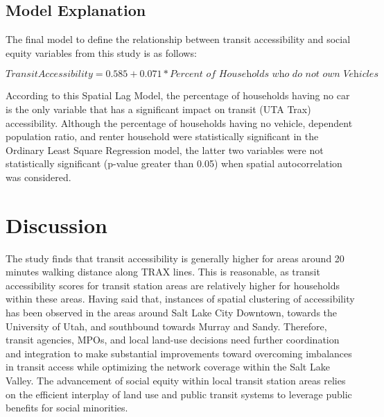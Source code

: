 \documentclass[numbered]{trbunofficial}
\begin{document}
\subsection{Model Explanation}
The final model to define the relationship between transit accessibility and social equity variables from this study is as follows:

\begin{linenomath}
  \begin{equation}
    Transit Accessibility = 0.585 + 0.071 * \textit{Percent of Households who do not own Vehicles}
      \end{equation}
\end{linenomath}

According to this Spatial Lag Model, the percentage of households having no car is the only variable that has a significant impact on transit (UTA Trax) accessibility. Although the percentage of households having no vehicle, dependent population ratio, and renter household were statistically significant in the Ordinary Least Square Regression model, the latter two variables were not statistically significant (p-value greater than 0.05) when spatial autocorrelation was considered.

\section{Discussion}

The study finds that transit accessibility is generally higher for areas around 20 minutes walking distance along TRAX lines. This is reasonable, as transit accessibility scores for transit station areas are relatively higher for households within these areas. Having said that, instances of spatial clustering of accessibility has been observed in the areas around Salt Lake City Downtown, towards the University of Utah, and southbound towards Murray and Sandy. Therefore, transit agencies, MPOs, and local land-use decisions need further coordination and integration to make substantial improvements toward overcoming imbalances in transit access while optimizing the network coverage within the Salt Lake Valley. The advancement of social equity within local transit station areas relies on the efficient interplay of land use and public transit systems to leverage public benefits for social minorities.
\end{document}
